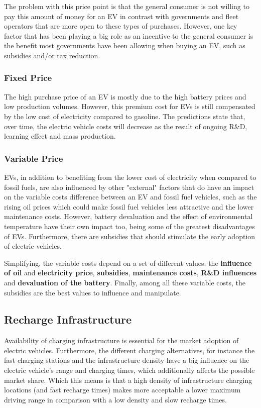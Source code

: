 The problem with this price point is that the general consumer is not willing to pay this amount of money for an EV in contrast with governments and fleet operators that are more open to these types of purchases. However, one key factor that has been playing a big role as an incentive to the general consumer is the benefit most governments have been allowing when buying an EV, such as subsidies and/or tax reduction.

\subsubsection{Fixed Price}
The high purchase price of an EV is mostly due to the high battery prices and low production volumes. However, this premium cost for EVs is still compensated by the low cost of electricity compared to gasoline. The predictions state that, over time, the electric vehicle costs will decrease as the result of ongoing R\&D, learning effect and mass production.

\subsubsection{Variable Price}
EVs, in addition to benefiting from the lower cost of electricity when compared to fossil fuels, are also influenced by other "external" factors that do have an impact on the variable costs difference between an EV and fossil fuel vehicles, such as the rising oil prices which could make fossil fuel vehicles less attractive and the lower maintenance costs. However, battery devaluation and the effect of environmental temperature have their own impact too, being some of the greatest disadvantages of EVs. Furthermore, there are subsidies that should stimulate the early adoption of electric vehicles.

Simplifying, the variable costs depend on a set of different values: the \textbf{influence of oil} and \textbf{electricity price}, \textbf{subsidies}, \textbf{maintenance costs}, \textbf{R\&D influences} and \textbf{devaluation of the battery}. Finally, among all these variable costs, the subsidies are the best values to influence and manipulate.

\subsection{Recharge Infrastructure}
Availability of charging infrastructure is essential for the market adoption of electric vehicles. Furthermore, the different charging alternatives, for instance the fast charging stations and the infrastructure density have a big influence on the electric vehicle's range and charging times, which additionally affects the possible market share. Which this means is that a high density of infrastructure charging locations (and fast recharge times) makes more acceptable a lower maximum driving range in comparison with a low density and slow recharge times.

